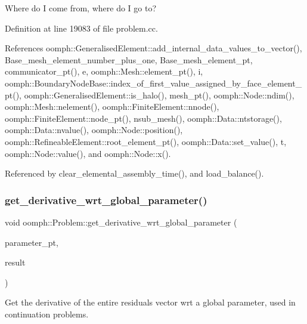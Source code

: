 Where do I come from, where do I go to? 

Definition at line 19083 of file problem.\+cc.



References oomph\+::\+Generalised\+Element\+::add\+\_\+internal\+\_\+data\+\_\+values\+\_\+to\+\_\+vector(), Base\+\_\+mesh\+\_\+element\+\_\+number\+\_\+plus\+\_\+one, Base\+\_\+mesh\+\_\+element\+\_\+pt, communicator\+\_\+pt(), e, oomph\+::\+Mesh\+::element\+\_\+pt(), i, oomph\+::\+Boundary\+Node\+Base\+::index\+\_\+of\+\_\+first\+\_\+value\+\_\+assigned\+\_\+by\+\_\+face\+\_\+element\+\_\+pt(), oomph\+::\+Generalised\+Element\+::is\+\_\+halo(), mesh\+\_\+pt(), oomph\+::\+Node\+::ndim(), oomph\+::\+Mesh\+::nelement(), oomph\+::\+Finite\+Element\+::nnode(), oomph\+::\+Finite\+Element\+::node\+\_\+pt(), nsub\+\_\+mesh(), oomph\+::\+Data\+::ntstorage(), oomph\+::\+Data\+::nvalue(), oomph\+::\+Node\+::position(), oomph\+::\+Refineable\+Element\+::root\+\_\+element\+\_\+pt(), oomph\+::\+Data\+::set\+\_\+value(), t, oomph\+::\+Node\+::value(), and oomph\+::\+Node\+::x().



Referenced by clear\+\_\+elemental\+\_\+assembly\+\_\+time(), and load\+\_\+balance().

\mbox{\label{classoomph_1_1Problem_af4d959a47ef6a8d50b394a6761dfab5a}} 
\subsubsection{\texorpdfstring{get\+\_\+derivative\+\_\+wrt\+\_\+global\+\_\+parameter()}{get\_derivative\_wrt\_global\_parameter()}}
{\footnotesize\ttfamily void oomph\+::\+Problem\+::get\+\_\+derivative\+\_\+wrt\+\_\+global\+\_\+parameter (\begin{DoxyParamCaption}\item[{double $\ast$const \&}]{parameter\+\_\+pt,  }\item[{\hyperlink{classoomph_1_1DoubleVector}{Double\+Vector} \&}]{result }\end{DoxyParamCaption})}



Get the derivative of the entire residuals vector wrt a global parameter, used in continuation problems. 

